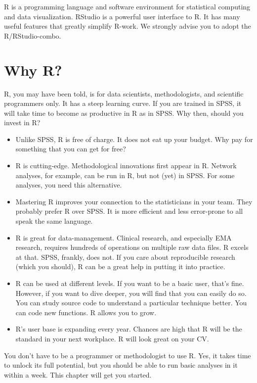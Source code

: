 \documentclass[]{book}
\begin{document}
R is a programming language and software environment for statistical
computing and data visualization. RStudio is a powerful user interface
to R. It has many useful features that greatly simplify R-work. We
strongly advise you to adopt the R/RStudio-combo.

\section{Why R?}\label{why-r}

R, you may have been told, is for data scientists, methodologists, and
scientific programmers only. It has a steep learning curve. If you are
trained in SPSS, it will take time to become as productive in R as in
SPSS. Why then, should you invest in R?

\begin{itemize}
\item
  Unlike SPSS, R is free of charge. It does not eat up your budget. Why
  pay for something that you can get for free?
\item
  R is cutting-edge. Methodological innovations first appear in R.
  Network analyses, for example, can be run in R, but not (yet) in SPSS.
  For some analyses, you need this alternative.
\item
  Mastering R improves your connection to the statisticians in your
  team. They probably prefer R over SPSS. It is more efficient and less
  error-prone to all speak the same language.
\item
  R is great for data-management. Clinical research, and especially EMA
  research, requires hundreds of operations on multiple raw data files.
  R excels at that. SPSS, frankly, does not. If you care about
  reproducible research (which you should), R can be a great help in
  putting it into practice.
\item
  R can be used at different levels. If you want to be a basic user,
  that's fine. However, if you want to dive deeper, you will find that
  you can easily do so. You can study source code to understand a
  particular technique better. You can code new functions. R allows you
  to grow.
\item
  R's user base is expanding every year. Chances are high that R will be
  the standard in your next workplace. R will look great on your CV.
\end{itemize}

You don't have to be a programmer or methodologist to use R. Yes, it
takes time to unlock its full potential, but you should be able to run
basic analyses in it within a week. This chapter will get you started.
\end{document}
